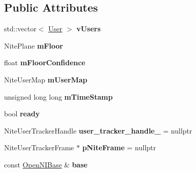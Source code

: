 \subsection*{Public Attributes}
\begin{DoxyCompactItemize}
\item 
\hypertarget{structs9_1_1oni_1_1OpenNISkeleton_1_1SharedObject_aea5240411a6e16bb8d0966d779517d39}{std\-::vector$<$ \hyperlink{classs9_1_1oni_1_1OpenNISkeleton_1_1User}{User} $>$ {\bfseries v\-Users}}\label{structs9_1_1oni_1_1OpenNISkeleton_1_1SharedObject_aea5240411a6e16bb8d0966d779517d39}

\item 
\hypertarget{structs9_1_1oni_1_1OpenNISkeleton_1_1SharedObject_a3014853d574a6b653bfdcb002f91e35f}{Nite\-Plane {\bfseries m\-Floor}}\label{structs9_1_1oni_1_1OpenNISkeleton_1_1SharedObject_a3014853d574a6b653bfdcb002f91e35f}

\item 
\hypertarget{structs9_1_1oni_1_1OpenNISkeleton_1_1SharedObject_aec41eb82cf7720c309867567b2dc88c6}{float {\bfseries m\-Floor\-Confidence}}\label{structs9_1_1oni_1_1OpenNISkeleton_1_1SharedObject_aec41eb82cf7720c309867567b2dc88c6}

\item 
\hypertarget{structs9_1_1oni_1_1OpenNISkeleton_1_1SharedObject_a10accd1a30a6fed672daad59f32727df}{Nite\-User\-Map {\bfseries m\-User\-Map}}\label{structs9_1_1oni_1_1OpenNISkeleton_1_1SharedObject_a10accd1a30a6fed672daad59f32727df}

\item 
\hypertarget{structs9_1_1oni_1_1OpenNISkeleton_1_1SharedObject_a09409c458ec0518b7ee20349cc8c748c}{unsigned long long {\bfseries m\-Time\-Stamp}}\label{structs9_1_1oni_1_1OpenNISkeleton_1_1SharedObject_a09409c458ec0518b7ee20349cc8c748c}

\item 
\hypertarget{structs9_1_1oni_1_1OpenNISkeleton_1_1SharedObject_a734226d165337262ccf9da01789e3a13}{bool {\bfseries ready}}\label{structs9_1_1oni_1_1OpenNISkeleton_1_1SharedObject_a734226d165337262ccf9da01789e3a13}

\item 
\hypertarget{structs9_1_1oni_1_1OpenNISkeleton_1_1SharedObject_ae14e0be94b65e2818e44d8c417da85b4}{Nite\-User\-Tracker\-Handle {\bfseries user\-\_\-tracker\-\_\-handle\-\_\-} = nullptr}\label{structs9_1_1oni_1_1OpenNISkeleton_1_1SharedObject_ae14e0be94b65e2818e44d8c417da85b4}

\item 
\hypertarget{structs9_1_1oni_1_1OpenNISkeleton_1_1SharedObject_a0e224cc91eefccfcd3d454d3fe116288}{Nite\-User\-Tracker\-Frame $\ast$ {\bfseries p\-Nite\-Frame} = nullptr}\label{structs9_1_1oni_1_1OpenNISkeleton_1_1SharedObject_a0e224cc91eefccfcd3d454d3fe116288}

\item 
\hypertarget{structs9_1_1oni_1_1OpenNISkeleton_1_1SharedObject_ab1c99416814b92b5b5c5fe6092bd3903}{const \hyperlink{classs9_1_1oni_1_1OpenNIBase}{Open\-N\-I\-Base} \& {\bfseries base}}\label{structs9_1_1oni_1_1OpenNISkeleton_1_1SharedObject_ab1c99416814b92b5b5c5fe6092bd3903}

\end{DoxyCompactItemize}


